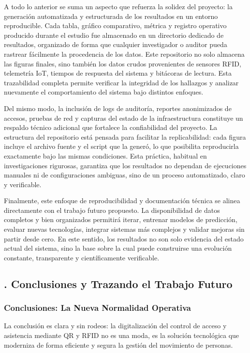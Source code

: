 A todo lo anterior se suma un aspecto que refuerza la solidez del proyecto: la generación automatizada y estructurada de los resultados en un entorno reproducible. Cada tabla, gráfico comparativo, métrica y registro operativo producido durante el estudio fue almacenado en un directorio dedicado de resultados, organizado de forma que cualquier investigador o auditor pueda rastrear fácilmente la procedencia de los datos. Este repositorio no solo almacena las figuras finales, sino también los datos crudos provenientes de sensores RFID, telemetría IoT, tiempos de respuesta del sistema y bitácoras de lectura. Esta trazabilidad completa permite verificar la integridad de los hallazgos y analizar nuevamente el comportamiento del sistema bajo distintos enfoques.

Del mismo modo, la inclusión de logs de auditoría, reportes anonimizados de accesos, pruebas de red y capturas del estado de la infraestructura constituye un respaldo técnico adicional que fortalece la confiabilidad del proyecto. La estructura del repositorio está pensada para facilitar la replicabilidad: cada figura incluye el archivo fuente y el script que la generó, lo que posibilita reproducirla exactamente bajo las mismas condiciones. Esta práctica, habitual en investigaciones rigurosas, garantiza que los resultados no dependan de ejecuciones manuales ni de configuraciones ambiguas, sino de un proceso automatizado, claro y verificable.

Finalmente, este enfoque de reproducibilidad y documentación técnica se alinea directamente con el trabajo futuro propuesto. La disponibilidad de datos completos y bien organizados permitirá iterar, entrenar modelos de predicción, evaluar nuevas tecnologías, integrar sistemas más complejos y validar mejoras sin partir desde cero. En este sentido, los resultados no son solo evidencia del estado actual del sistema, sino la base sobre la cual puede construirse una evolución constante, transparente y científicamente verificable.



\subsection*{. Conclusiones y Trazando el Trabajo Futuro}

\subsubsection*{ Conclusiones: La Nueva Normalidad Operativa}
La conclusión es clara y sin rodeos: la digitalización del control de acceso y asistencia mediante QR y RFID no es una moda, es la solución tecnológica que moderniza de forma eficiente y segura la gestión del movimiento de personas.

